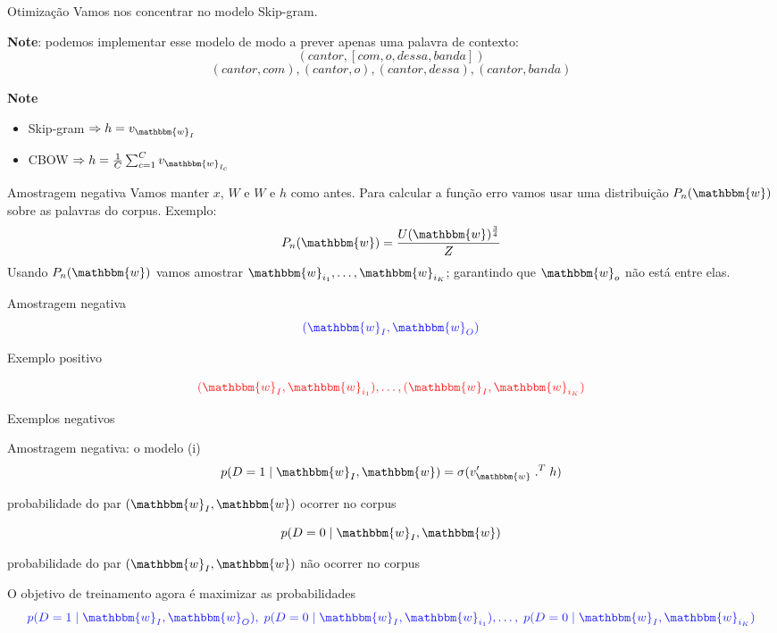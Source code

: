 \documentclass{beamer}
\newcommand{\wo}{\mathbbm{w}}
\begin{document}
\begin{frame}[fragile]{Otimização}
Vamos nos concentrar no modelo Skip-gram. 

\vspace{0.2cm}

\textbf{Note}: podemos implementar esse modelo de modo a prever apenas uma palavra de contexto:\\

\[
(cantor, [com, o, dessa, banda])
\]
\[
(cantor,com), (cantor,o), (cantor,dessa), (cantor,banda)
\]

\textbf{Note}
\begin{itemize}
\item Skip-gram $\Rightarrow h = v_{\wo_I}$ 
\vspace{0.1cm}
\item CBOW $\Rightarrow h = \frac{1}{C}\sum_{c=1}^{C}v_{\wo_{I_{c}}}$ 
\end{itemize}

\end{frame}



\begin{frame}[fragile]{Amostragem negativa}
Vamos manter $x$, $W$ e $W$ e $h$ como antes. Para calcular a função erro vamos usar uma distribuição $P_{n}(\wo)$ sobre as palavras do corpus. Exemplo:\\
\[
P_{n}(\wo) = \frac{U(\wo)^{\frac{3}{4}}}{Z}
\]
\vspace{0.1cm}
Usando $P_{n}(\wo)$ vamos amostrar $\wo_{i_{1}}, \dots , \wo_{i_{K}}$; garantindo que $\wo_{o}$ não está entre elas. 
\end{frame}
\begin{frame}[fragile]{Amostragem negativa}
\[
{\color{blue!89}(\wo_{I},\wo_{O})}
\]
\begin{center}
{\color{blue!89}Exemplo positivo}
\end{center}

\[
{\color{red!89}(\wo_{I},\wo_{i_{1}}), \dots, (\wo_{I},\wo_{i_{K}})}
\]
\begin{center}
{\color{red!89}Exemplos negativos}
\end{center}


\end{frame}
\begin{frame}[fragile]{Amostragem negativa: o modelo (i)}
\[
p(D=1 \;|\; \wo_I,\wo) = \sigma(v_{\wo}^{\prime} \; .^{T} \;h)
\]
\begin{center}
probabilidade do par $(\wo_{I},\wo)$ ocorrer no corpus 
\end{center}
\[
p(D=0 \;|\; \wo_I,\wo)
\]
\begin{center}
probabilidade do par $(\wo_{I},\wo)$ não ocorrer no corpus 
\end{center}
\vspace{0.3cm}
O objetivo de treinamento agora é maximizar as probabilidades  
\[
{\color{blue!89}p(D=1 \;|\; \wo_I,\wo_{O}),\; p(D=0 \;|\; \wo_I,\wo_{i_{1}}), \dots , \; p(D=0 \;|\; \wo_I,\wo_{i_{K}})}
\]
\end{frame}
\end{document}
